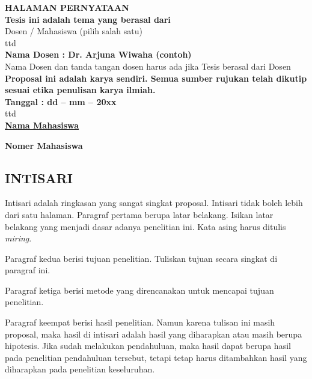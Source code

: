 \documentclass[12pt]{article}
\begin{document}
\begin{center}

{ \large \bfseries HALAMAN PERNYATAAN}\\[2.4cm]

{ \large \bfseries Tesis ini adalah tema yang berasal dari}\\[0.4cm]

{ \large Dosen / Mahasiswa (pilih salah satu)}\\[1.4cm]

ttd\\[1.4cm]

{ \large \bfseries Nama Dosen : Dr. Arjuna Wiwaha (contoh)}\\[1.4cm]

{ \large Nama Dosen dan tanda tangan dosen harus ada jika Tesis berasal dari Dosen}\\[1.4cm]

{ \large \bfseries Proposal ini adalah karya sendiri. Semua sumber rujukan telah dikutip sesuai etika penulisan karya ilmiah.}\\[1.4cm]

{ \large \bfseries Tanggal : dd -- mm -- 20xx}\\[1.4cm]

ttd\\[1.4cm]

\uline{\textbf{\large Nama Mahasiswa}}

\textbf{\large Nomer Mahasiswa}
\end{center}
\newpage
\begin{center}
\section*{INTISARI}
\end{center}

Intisari adalah ringkasan yang sangat singkat proposal. Intisari tidak boleh lebih dari satu halaman. Paragraf pertama berupa latar belakang. Isikan latar belakang yang menjadi dasar adanya penelitian ini. Kata asing harus ditulis \textit{miring}.

Paragraf kedua berisi tujuan penelitian. Tuliskan tujuan secara singkat di paragraf ini.

Paragraf ketiga berisi metode yang direncanakan untuk mencapai tujuan penelitian.

Paragraf keempat berisi hasil penelitian. Namun karena tulisan ini masih proposal, maka hasil di intisari adalah hasil yang diharapkan atau masih berupa hipotesis. Jika sudah melakukan pendahuluan, maka hasil dapat berupa hasil pada penelitian pendahuluan tersebut, tetapi tetap harus ditambahkan hasil yang diharapkan pada penelitian keseluruhan.\\
\end{document}
